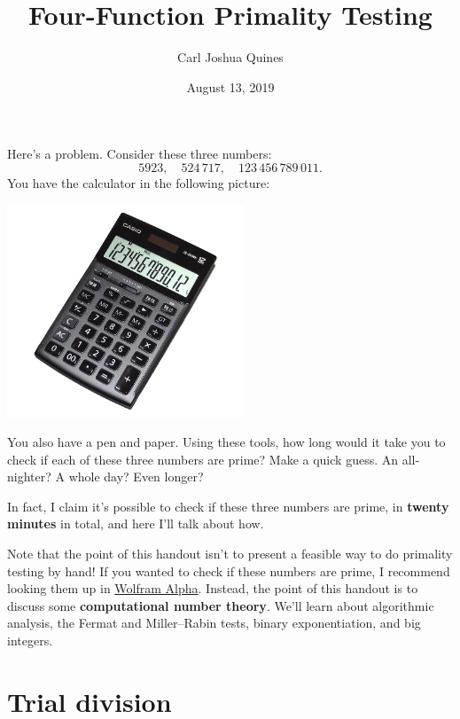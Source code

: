 \documentclass[11pt,paper=letter]{scrartcl}
\begin{document}
\title{Four-Function Primality Testing}
\author{Carl Joshua Quines}
\date{August 13, 2019}

\maketitle


\noindent Here's a problem. Consider these three numbers:
$$5923,\quad 524\,717,\quad 123\,456\,789\,011.$$
You have the calculator in the following picture:
\begin{center}
  \includegraphics[height=2.5in]{1.jpg}
\end{center}
You also have a pen and paper. Using these tools, how long would it take you to check if each of these three numbers are prime? Make a quick guess. An all-nighter? A whole day? Even longer?

In fact, I claim it's possible to check if these three numbers are prime, in \textbf{twenty minutes} in total, and here I'll talk about how.

Note that the point of this handout isn't to present a feasible way to do primality testing by hand! If you wanted to check if these numbers are prime, I recommend looking them up in \href{https://www.wolframalpha.com/input/?i=is+123456789011+prime}{Wolfram Alpha}. Instead, the point of this handout is to discuss some \textbf{computational number theory}. We'll learn about algorithmic analysis, the Fermat and Miller--Rabin tests, binary exponentiation, and big integers.

\section{Trial division}
\end{document}
